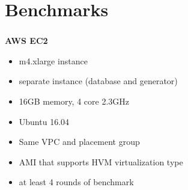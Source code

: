 \documentclass[usenames,dvipsnames, 18pt, compress, aspectratio=169]{beamer}
\begin{document}
\fontsize{17pt}{19}\selectfont
{}

\fontsize{13pt}{14}\selectfont
\section{Benchmarks}
\fontsize{17pt}{18}\selectfont

%
\begin{frame}
    \frametitle{}
\end{frame}

\begin{frame}
    \frametitle{}
    \begin{center}
        \textbf{AWS EC2}
        \begin{itemize}[label={}]
            \item m4.xlarge instance
            \item separate instance (database and generator)
            \item 16GB memory, 4 core 2.3GHz
            \item Ubuntu 16.04
            \item Same VPC and placement group
            \item AMI that supports HVM virtualization type
            \item at least 4 rounds of benchmark
        \end{itemize}
    \end{center}
\end{frame}
\end{document}

